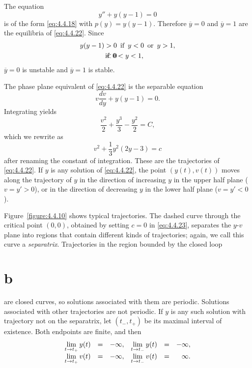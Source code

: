 \begin{example}
  \label{example:4.4.3}\rm The equation
  \begin{equation}
    \label{eq:4.4.22}y''+y(y-1)=0
  \end{equation}
  is of the form \eqref{eq:4.4.18} with $p(y)=y(y-1)$. Therefore $\overline{y}=0$ and
  $\overline{y}=1$ are the equilibria of \eqref{eq:4.4.22}. Since
  \begin{eqnarray*}
    y(y-1)>0 & \text{\, if \,}y<0\mbox{\, or \,}y>1, \\
    <0       & \hspace*{-22pt}\text{\, if \,}0<y<1,
  \end{eqnarray*}
  $\overline{y}=0$ is unstable and $\overline{y}=1$ is stable.

  The phase plane equivalent of \eqref{eq:4.4.22} is the separable equation
  \[
    v\frac{dv}{dy}+y(y-1)=0.
  \]
  Integrating yields
  \[
    \frac{v^{2}}{2}+\frac{y^{3}}{3}-\frac{y^{2}}{2}=C,
  \]
  which we rewrite as
  \begin{equation}
    \label{eq:4.4.23}v^{2}+\frac{1}{3}y^{2}(2y-3)=c
  \end{equation}
  after renaming the constant of integration. These are the trajectories of \eqref{eq:4.4.22}. If
  $y$ is any solution of \eqref{eq:4.4.22}, the point $(y(t),v(t))$ moves along the trajectory of
  $y$ in the direction of increasing $y$ in the upper half plane ($v=y'>0$), or in the direction of
  decreasing $y$ in the lower half plane ($v=y'<0$).

  Figure~\ref{figure:4.4.10} shows typical trajectories. The dashed curve through the critical point
  $(0,0)$, obtained by setting $c=0$ in \eqref{eq:4.4.23}, separates the $y$-$v$ plane into regions
  that contain different kinds of trajectories; again, we call this curve a {\color{blue}\it
  separatrix\/}. Trajectories in the region bounded by the closed loop \part{b} are closed curves,
  so solutions associated with them are periodic. Solutions associated with other trajectories are
  not periodic. If $y$ is any such solution with trajectory not on the separatrix, let $(t_{-},t_{+})$ be its maximal interval of existence. Both endpoints are finite, and then
  \[
    \begin{array}{llrllr}
      \displaystyle\lim_{t\to t_{+}}y(t) & = & -\infty, & \displaystyle\lim_{t\to t_{-}}y(t) & = & -\infty, \\
      \displaystyle\lim_{t\to t_{+}}v(t) & = & -\infty, & \displaystyle\lim_{t\to t_{-}}v(t) & = & \infty.
    \end{array}
  \]


\end{example}
